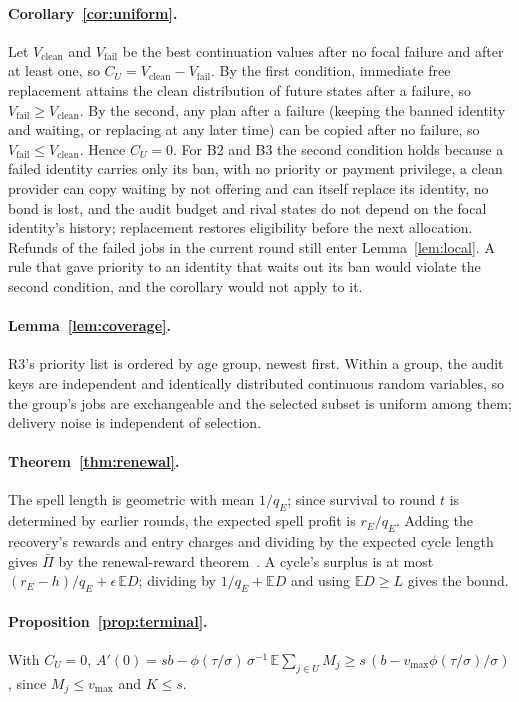 \documentclass[11pt]{article}
\begin{document}
\paragraph{Corollary~\ref{cor:uniform}.} Let $V_{\mathrm{clean}}$ and $V_{\mathrm{fail}}$ be the best continuation values after no focal failure and after at least one, so $C_U = V_{\mathrm{clean}} - V_{\mathrm{fail}}$. By the first condition, immediate free replacement attains the clean distribution of future states after a failure, so $V_{\mathrm{fail}} \ge V_{\mathrm{clean}}$. By the second, any plan after a failure (keeping the banned identity and waiting, or replacing at any later time) can be copied after no failure, so $V_{\mathrm{fail}} \le V_{\mathrm{clean}}$. Hence $C_U = 0$. For B2 and B3 the second condition holds because a failed identity carries only its ban, with no priority or payment privilege, a clean provider can copy waiting by not offering and can itself replace its identity, no bond is lost, and the audit budget and rival states do not depend on the focal identity's history; replacement restores eligibility before the next allocation. Refunds of the failed jobs in the current round still enter Lemma~\ref{lem:local}. A rule that gave priority to an identity that waits out its ban would violate the second condition, and the corollary would not apply to it.

\paragraph{Lemma~\ref{lem:coverage}.} R3's priority list is ordered by age group, newest first. Within a group, the audit keys are independent and identically distributed continuous random variables, so the group's jobs are exchangeable and the selected subset is uniform among them; delivery noise is independent of selection.

\paragraph{Theorem~\ref{thm:renewal}.} The spell length is geometric with mean $1/q_E$; since survival to round $t$ is determined by earlier rounds, the expected spell profit is $r_E/q_E$. Adding the recovery's rewards and entry charges and dividing by the expected cycle length gives $\bar\Pi$ by the renewal-reward theorem~\cite{vlasiou2014renewal}. A cycle's surplus is at most $(r_E - h)/q_E + \epsilon\,\mathbb{E}D$; dividing by $1/q_E + \mathbb{E}D$ and using $\mathbb{E}D \ge L$ gives the bound.

\paragraph{Proposition~\ref{prop:terminal}.} With $C_U = 0$, $A'(0) = s b - \phi(\tau/\sigma)\,\sigma^{-1}\,\mathbb{E}\sum_{j \in U} M_j \ge s\,(b - v_{\max}\phi(\tau/\sigma)/\sigma)$, since $M_j \le v_{\max}$ and $K \le s$.



\end{document}
